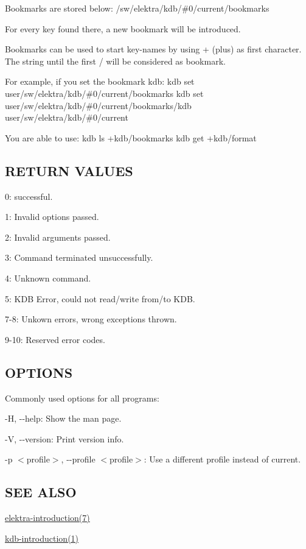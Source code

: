 Bookmarks are stored below\+: {\ttfamily /sw/elektra/kdb/\#0/current/bookmarks}

For every key found there, a new bookmark will be introduced.

Bookmarks can be used to start key-\/names by using {\ttfamily +} (plus) as first character. The string until the first {\ttfamily /} will be considered as bookmark.

For example, if you set the bookmark kdb\+: {\ttfamily kdb set user/sw/elektra/kdb/\#0/current/bookmarks} {\ttfamily kdb set user/sw/elektra/kdb/\#0/current/bookmarks/kdb user/sw/elektra/kdb/\#0/current}

You are able to use\+: {\ttfamily kdb ls +kdb/bookmarks} {\ttfamily kdb get +kdb/format}

\subsection*{R\+E\+T\+U\+R\+N V\+A\+L\+U\+E\+S}


\begin{DoxyItemize}
\item 0\+: successful.
\item 1\+: Invalid options passed.
\item 2\+: Invalid arguments passed.
\item 3\+: Command terminated unsuccessfully.
\item 4\+: Unknown command.
\item 5\+: K\+D\+B Error, could not read/write from/to K\+D\+B.
\item 7-\/8\+: Unkown errors, wrong exceptions thrown.
\item 9-\/10\+: Reserved error codes.
\end{DoxyItemize}

\subsection*{O\+P\+T\+I\+O\+N\+S}

Commonly used options for all programs\+:


\begin{DoxyItemize}
\item {\ttfamily -\/\+H}, {\ttfamily -\/-\/help}\+: Show the man page.
\item {\ttfamily -\/\+V}, {\ttfamily -\/-\/version}\+: Print version info.
\item {\ttfamily -\/p $<$profile$>$}, {\ttfamily -\/-\/profile $<$profile$>$}\+: Use a different profile instead of current.
\end{DoxyItemize}

\subsection*{S\+E\+E A\+L\+S\+O}


\begin{DoxyItemize}
\item \hyperlink{md_doc_help_elektra-introduction_doc_help_elektra-introduction_md}{elektra-\/introduction(7)}
\item \hyperlink{doc_help_kdb-introduction_md}{kdb-\/introduction(1)} 
\end{DoxyItemize}